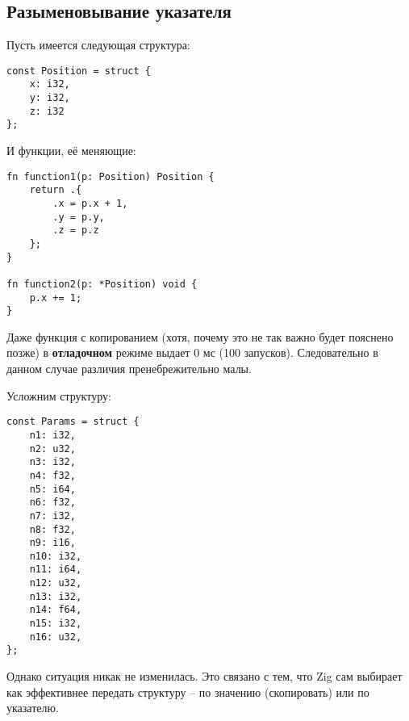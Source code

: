 \subsection{Разыменовывание указателя}

Пусть имеется следующая структура:
\begin{lstlisting}
const Position = struct {
    x: i32,
    y: i32,
    z: i32
};    
\end{lstlisting}

И функции, её меняющие:
\begin{lstlisting}
fn function1(p: Position) Position {
    return .{
        .x = p.x + 1,
        .y = p.y,
        .z = p.z
    };
}

fn function2(p: *Position) void {
    p.x += 1;
}
\end{lstlisting}

Даже функция с копированием (хотя, почему это не так важно будет пояснено позже) в \textbf{отладочном} режиме выдает 0 мс (100 запусков). Следовательно в данном случае различия пренебрежительно малы.

Усложним структуру:
\begin{lstlisting}
const Params = struct {
    n1: i32,
    n2: u32,
    n3: i32,
    n4: f32,
    n5: i64,
    n6: f32,
    n7: i32,
    n8: f32,
    n9: i16,
    n10: i32,
    n11: i64,
    n12: u32,
    n13: i32,
    n14: f64,
    n15: i32,
    n16: u32,
};
\end{lstlisting}

Однако ситуация никак не изменилась. Это связано с тем, что Zig сам выбирает как эффективнее передать структуру -- по значению (скопировать) или по указателю.

